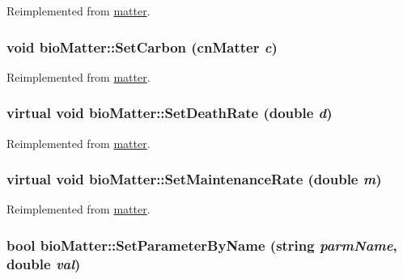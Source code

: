 Reimplemented from \hyperlink{classmatter_abaf880e3b1efd04eae0db055caed9b12}{matter}.\hypertarget{classbio_matter_ab5e10fda0c8137df57be8baade98d27c}{
\subsubsection[{SetCarbon}]{\setlength{\rightskip}{0pt plus 5cm}void bioMatter::SetCarbon ({\bf cnMatter} {\em c})}}
\label{classbio_matter_ab5e10fda0c8137df57be8baade98d27c}


Reimplemented from \hyperlink{classmatter_a6ede9887bd438658b4833d1242d8e2a7}{matter}.\hypertarget{classbio_matter_a506d0acd5dfdf32d7742b90961c1cf6d}{
\subsubsection[{SetDeathRate}]{\setlength{\rightskip}{0pt plus 5cm}virtual void bioMatter::SetDeathRate (double {\em d})}}
\label{classbio_matter_a506d0acd5dfdf32d7742b90961c1cf6d}


Reimplemented from \hyperlink{classmatter_a2969cf8d4330d010ce8b2d7c9f989364}{matter}.\hypertarget{classbio_matter_adfb5f616faed3698fa71b8a29b091014}{
\subsubsection[{SetMaintenanceRate}]{\setlength{\rightskip}{0pt plus 5cm}virtual void bioMatter::SetMaintenanceRate (double {\em m})}}
\label{classbio_matter_adfb5f616faed3698fa71b8a29b091014}


Reimplemented from \hyperlink{classmatter_aa6ecf5e0a7bf435208005c087e2f5afa}{matter}.\hypertarget{classbio_matter_a1ade505ad2c176aedbcf4b3e937eb412}{
\subsubsection[{SetParameterByName}]{\setlength{\rightskip}{0pt plus 5cm}bool bioMatter::SetParameterByName (string {\em parmName}, \/  double {\em val})}}
\label{classbio_matter_a1ade505ad2c176aedbcf4b3e937eb412}


